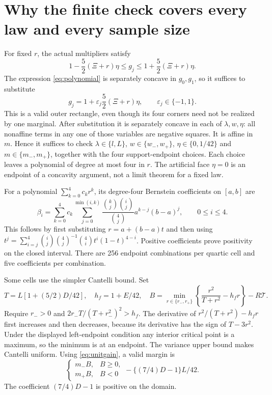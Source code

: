 \documentclass[11pt,a4paper]{article}
\begin{document}
\section{Why the finite check covers every law and every sample size}
For fixed $r$, the actual multipliers satisfy
\[
 1-\frac52(\Xi+r)\eta\le g_j\le
 1+\frac52(\Xi+r)\eta.
\]
The expression \eqref{eq:polynomial} is separately concave in $g_0,g_1$,
so it suffices to substitute
\[
 g_j=1+\varepsilon_j\frac52(\Xi+r)\eta,
                    \qquad\varepsilon_j\in\{-1,1\}.
\]
This is a valid outer rectangle, even though its four corners need not
be realized by one marginal. After substitution it is separately concave
in each of $\lambda,w,\eta$: all nonaffine terms in any one of those
variables are negative squares. It is affine in $m$. Hence it suffices to
check $\lambda\in\{l,L\}$, $w\in\{w_-,w_+\}$,
$\eta\in\{0,1/42\}$ and $m\in\{m_-,m_+\}$, together with the four
support-endpoint choices. Each choice leaves a polynomial of degree at
most four in $r$. The artificial face $\eta=0$ is an endpoint of a
concavity argument, not a limit theorem for a fixed law.

For a polynomial $\sum_{k=0}^4 c_kr^k$, its degree-four Bernstein
coefficients on $[a,b]$ are
\[
 \beta_i=\sum_{k=0}^4 c_k
  \sum_{j=0}^{\min(i,k)}
   \frac{\binom kj\binom ij}{\binom4j}a^{k-j}(b-a)^j,
                       \qquad0\le i\le4.
\]
This follows by first substituting $r=a+(b-a)t$ and then using
$t^j=\sum_{i=j}^4\binom ij\binom4j^{-1}\binom4i t^i(1-t)^{4-i}$.
Positive coefficients prove positivity on the closed interval.
There are 256 endpoint combinations per quartic cell and five coefficients
per combination.

Some cells use the simpler Cantelli bound. Set
\[
 T=L[1+(5/2)D/42],\quad h_f=1+E/42,\quad
 B=\min_{r\in\{r_-,r_+\}}\left\{\frac{r^2}{T+r^2}-h_fr\right\}
                         -R\mathcal T.
\]
Require $r_->0$ and $2r_-T/(T+r_-^2)^2>h_f$.
The derivative of $r^2/(T+r^2)-h_fr$ first increases and then decreases,
because its derivative has the sign of $T-3r^2$. Under the displayed
left-endpoint condition any interior critical point is a maximum, so the
minimum is at an endpoint. The variance upper bound makes Cantelli
uniform. Using \eqref{eq:unitgain}, a valid margin is
\begin{equation}\label{eq:cantelli}
 \begin{cases}m_-B,&B\ge0,\\m_+B,&B<0\end{cases}
                        -\{(7/4)D-1\}L/42.
\end{equation}
The coefficient $(7/4)D-1$ is positive on the domain.
\end{document}
